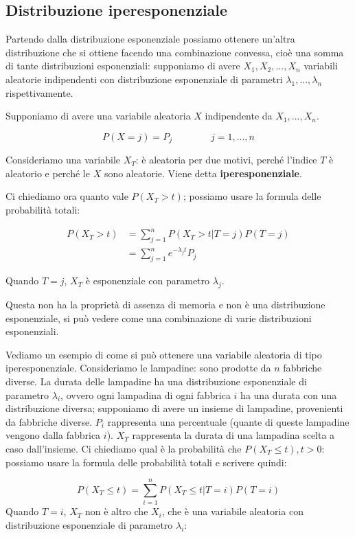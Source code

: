 \documentclass[a4paper,12pt]{book}
\begin{document}
\subsection{Distribuzione iperesponenziale}

Partendo dalla distribuzione esponenziale possiamo ottenere un'altra distribuzione che si ottiene facendo una combinazione convessa, cioè una somma di tante distribuzioni esponenziali: supponiamo di avere $ X_1, X_2, ..., X_n $ variabili aleatorie indipendenti con distribuzione esponenziale di parametri $ \lambda_1, ..., \lambda_n $ rispettivamente. 

Supponiamo di avere una variabile aleatoria $ X $ indipendente da $ X_1, ..., X_n $.

$$ P(X = j) = P_j \qquad \qquad j = 1, ..., n $$

Consideriamo una variabile $ X_T $: è aleatoria per due motivi, perché l'indice $ T $ è aleatorio e perché le $ X $ sono aleatorie. Viene detta \textbf{iperesponenziale}.

Ci chiediamo ora quanto vale $ P(X_T > t) $; possiamo usare la formula delle probabilità totali:

\begin{align*}
	P(X_T > t) &= \sum_{j=1}^{n} P(X_T > t | T = j)P(T = j) \\
	& = \sum_{j = 1}^{n} e ^{-\lambda_j t} P_j
\end{align*}

Quando $ T = j $, $ X_T $ è esponenziale con parametro $\lambda_j$.

Questa non ha la proprietà di assenza di memoria e non è una distribuzione esponenziale, si può vedere come una combinazione di varie distribuzioni esponenziali. 


Vediamo un esempio di come si può ottenere una variabile aleatoria di tipo iperesponenziale. Consideriamo le lampadine: sono prodotte da $ n $ fabbriche diverse. La durata delle lampadine ha una distribuzione esponenziale di parametro $\lambda_i$, ovvero ogni lampadina di ogni fabbrica $ i $ ha una durata con una distribuzione diversa; supponiamo di avere un insieme di lampadine, provenienti da fabbriche diverse. $ P_i $ rappresenta una percentuale (quante di queste lampadine vengono dalla fabbrica $ i $). $ X_T $ rappresenta la durata di una lampadina scelta a caso dall'insieme. Ci chiediamo qual è la probabilità che $ P( X_T \le t), t > 0$: possiamo usare la formula delle probabilità totali e scrivere quindi:

$$ P( X_T \le t) = \sum_{i=1}^{n} P(X_T \le t | T = i) P(T = i) $$
Quando $ T = i $, $ X_T $ non è altro che $ X_i $, che è una variabile aleatoria con distribuzione esponenziale di parametro $\lambda_i$:
\end{document}
